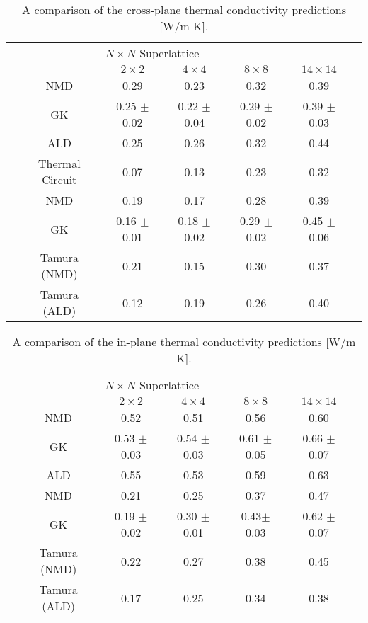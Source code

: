 \begin{table*}
\begin{center}
\begin{tabular*}{\textwidth}{c@{\extracolsep{\fill}}cccccc}
\hline\hline\noalign{\smallskip}
\multicolumn{2}{c}{\multirow{2}{*}{Cross-Plane}}& \multicolumn{4}{c}{$N\times N$ Superlattice} \\
\cline{3-6}\noalign{\smallskip}
\hspace{1cm} && $2\times2$ & $4\times4$ & $8\times8$ & $14\times14$  \\
\noalign{\smallskip}\hline\noalign{\smallskip}
\multirow{3}{*}{Perfect} &NMD & 0.29 & 0.23  & 0.32  & 0.39 \\
&GK & 0.25 $\pm$ 0.02 & 0.22 $\pm$ 0.04  &  0.29 $\pm$ 0.02  &  0.39 $\pm$ 0.03\\
&ALD & 0.25 &	0.26  &	0.32	 &0.44\\
&Thermal Circuit & 0.07  &  0.13  &  0.23  &  0.32\\
\noalign{\smallskip}\hline
\multirow{3}{*}{Mixed} &NMD &0.19 & 0.17 & 0.28 & 0.39\\
&GK  & 0.16 $\pm$ 0.01  &  0.18 $\pm$ 0.02 &  0.29 $\pm$ 0.02 &   0.45 $\pm$ 0.06\\
&Tamura (NMD) & 0.21 & 0.15 & 0.30 & 0.37\\
&Tamura (ALD) & 0.12 & 0.19 & 0.26 & 0.40\\
\hline\hline
\end{tabular*}
\end{center}
\renewcommand{\table}{Table.}
\caption{A comparison of the cross-plane thermal conductivity predictions [W/m K].}
\label{TB:K_CP}
\end{table*}

\begin{table*}
\begin{center}
\begin{tabular*}{\textwidth}{c@{\extracolsep{\fill}}cccccc}
\hline\hline\noalign{\smallskip}
\multicolumn{2}{c}{\multirow{2}{*}{In-Plane}}&\multicolumn{4}{c}{$N\times N$ Superlattice} \\
\cline{3-6}\noalign{\smallskip}
\hspace{1cm} && $2\times2$ & $4\times4$ & $8\times8$ & $14\times14$  \\
\noalign{\smallskip}\hline\noalign{\smallskip}
\multirow{2}{*}{Perfect} &NMD &0.52 & 0.51 & 0.56 & 0.60\\
&GK &0.53 $\pm$ 0.03 &  0.54 $\pm$ 0.03 &  0.61 $\pm$ 0.05  &  0.66 $\pm$ 0.07 \\
&ALD & 0.55	& 0.53	&	0.59 	&0.63\\
\noalign{\smallskip}\hline
\multirow{3}{*}{Mixed} & NMD &0.21 & 0.25 &	0.37 & 0.47\\
&GK & 0.19 $\pm$ 0.02 &  0.30 $\pm$ 0.01  & 0.43$\pm$ 0.03 &  0.62 $\pm$ 0.07 \\   
&Tamura (NMD)& 0.22 & 0.27 & 0.38 &0.45\\
&Tamura (ALD) & 0.17 & 0.25 & 0.34 &0.38\\
\hline\hline
\end{tabular*}
\end{center}
\renewcommand{\table}{Table.}
\caption{A comparison of the in-plane thermal conductivity predictions [W/m K].}
\label{TB:K_IP}
\end{table*}
